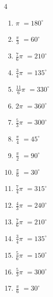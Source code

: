 \begin{multicols}{4}
\begin{enumerate}
  \item $\displaystyle \pi$
        $\displaystyle =180^{\circ}$

  \item $\displaystyle \frac{\pi}{3}$
        $\displaystyle =60^{\circ}$

  \item $\displaystyle \frac{7}{6}\pi$
        $\displaystyle =210^{\circ}$

  \item $\displaystyle \frac{3}{4}\pi$
        $\displaystyle =135^{\circ}$

  \item $\displaystyle \frac{11}{6}\pi$
        $\displaystyle =330^{\circ}$

  \item $\displaystyle 2\pi$
        $\displaystyle =360^{\circ}$

  \item $\displaystyle \frac{5}{3}\pi$
        $\displaystyle =300^{\circ}$

  \item $\displaystyle \frac{\pi}{4}$
        $\displaystyle =45^{\circ}$

  \item $\displaystyle \frac{\pi}{2}$
        $\displaystyle =90^{\circ}$

  \item $\displaystyle \frac{\pi}{6}$
        $\displaystyle =30^{\circ}$

  \item $\displaystyle \frac{7}{4}\pi$
        $\displaystyle =315^{\circ}$

\columnbreak %

  \item $\displaystyle \frac{4}{3}\pi$
        $\displaystyle =240^{\circ}$

  \item $\displaystyle \frac{7}{6}\pi$
        $\displaystyle =210^{\circ}$

  \item $\displaystyle \frac{3}{4}\pi$
        $\displaystyle =135^{\circ}$

  \item $\displaystyle \frac{5}{6}\pi$
        $\displaystyle =150^{\circ}$

  \item $\displaystyle \frac{5}{3}\pi$
        $\displaystyle =300^{\circ}$

  \item $\displaystyle \frac{\pi}{6}$
        $\displaystyle =30^{\circ}$


\end{enumerate}
\end{multicols}
